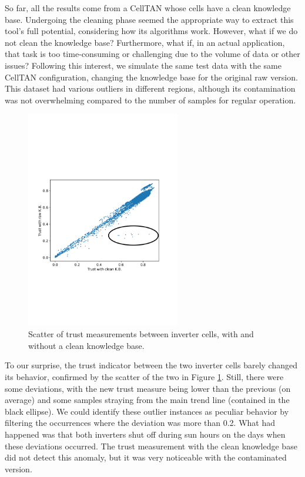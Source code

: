 So far, all the results come from a CellTAN whose cells have a clean knowledge base. Undergoing the cleaning phase seemed the appropriate way to extract this tool's full potential, considering how its algorithms work. However, what if we do not clean the knowledge base? Furthermore, what if, in an actual application, that task is too time-consuming or challenging due to the volume of data or other issues?
Following this interest, we simulate the same test data with the same CellTAN configuration, changing the knowledge base for the original raw version. This dataset had various outliers in different regions, although its contamination was not overwhelming compared to the number of samples for regular operation.


\begin{figure}[h!]
    \centering
    \includegraphics[width=0.6\textwidth,trim={0cm 7.5cm 0cm 9cm},clip]{figures/chapter5/results/real/trust_dirty_scatter_annotated-1.png}
    \caption{Scatter of trust measurements between inverter cells, with and without a clean knowledge base.}
    \label{fig:dirty_scatter}
\end{figure}

To our surprise, the trust indicator between the two inverter cells barely changed its behavior, confirmed by the scatter of the two in Figure \ref{fig:dirty_scatter}. Still, there were some deviations, with the new trust measure being lower than the previous (on average) and some samples straying from the main trend line (contained in the black ellipse). We could identify these outlier instances as peculiar behavior by filtering the occurrences where the deviation was more than 0.2. What had happened was that both inverters shut off during sun hours on the days when these deviations occurred. The trust measurement with the clean knowledge base did not detect this anomaly, but it was very noticeable with the contaminated version.

